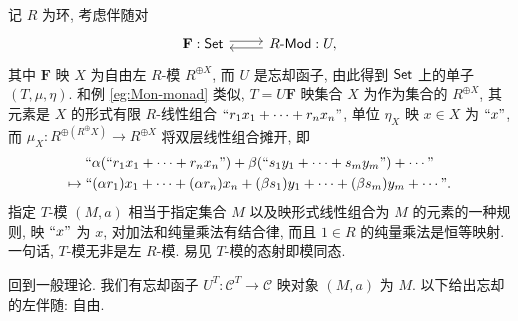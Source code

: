 \begin{example}\label{eg:Mod-monad}
	记 $R$ 为环, 考虑伴随对
	\[\begin{tikzcd}
		\mathbf{F}: \cate{Set} \arrow[r, shift left] & R\dcate{Mod}: U, \arrow[l, shift left]
	\end{tikzcd}\]
	其中 $\mathbf{F}$ 映 $X$ 为自由左 $R$-模 $R^{\oplus X}$, 而 $U$ 是忘却函子, 由此得到 $\mathsf{Set}$ 上的单子 $(T, \mu, \eta)$. 和例 \ref{eg:Mon-monad} 类似, $T = U\mathbf{F}$ 映集合 $X$ 为作为集合的 $R^{\oplus X}$, 其元素是 $X$ 的形式有限 $R$-线性组合 $\text{\textquotedblleft} r_1 x_1 + \cdots + r_n x_n \text{\textquotedblright}$, 单位 $\eta_X$ 映 $x \in X$ 为 $\text{\textquotedblleft} x \text{\textquotedblright}$, 而 $\mu_X: R^{\oplus (R^{\oplus} X)} \to R^{\oplus X}$ 将双层线性组合摊开, 即
	\begin{multline*}
		\text{\textquotedblleft} \alpha (\text{\textquotedblleft} r_1 x_1 + \cdots + r_n x_n \text{\textquotedblright}) + \beta (\text{\textquotedblleft} s_1 y_1 + \cdots + s_m y_m \text{\textquotedblright}) + \cdots \text{\textquotedblright} \\
		\mapsto \text{\textquotedblleft} (\alpha r_1) x_1 + \cdots + (\alpha r_n) x_n + (\beta s_1) y_1 + \cdots + (\beta s_m) y_m + \cdots \text{\textquotedblright} .
	\end{multline*}
	指定 $T$-模 $(M, a)$ 相当于指定集合 $M$ 以及映形式线性组合为 $M$ 的元素的一种规则, 映 $\text{\textquotedblleft} x \text{\textquotedblright}$ 为 $x$, 对加法和纯量乘法有结合律, 而且 $1 \in R$ 的纯量乘法是恒等映射. 一句话, $T$-模无非是左 $R$-模. 易见 $T$-模的态射即模同态.
\end{example}

回到一般理论. 我们有忘却函子 $U^T: \mathcal{C}^T \to \mathcal{C}$ 映对象 $(M, a)$ 为 $M$. 以下给出忘却的左伴随: 自由.

